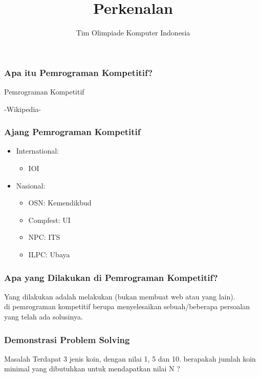 

\title{Perkenalan}
\author{Tim Olimpiade Komputer Indonesia}
\date{}



\begin{frame}
\titlepage
\end{frame}

\begin{frame}
\frametitle{Apa itu Pemrograman Kompetitif?}
\begin{block}{Pemrograman Kompetitif}

-Wikipedia-
\end{block}
\end{frame}

\begin{frame}
\frametitle{Ajang Pemrograman Kompetitif}
\begin{itemize}
  \item International:
    \begin{itemize}
    	\item IOI
    \end{itemize}
  \item Nasional:
    \begin{itemize}
    	\item OSN: Kemendikbud
    	\item Compfest: UI
    	\item NPC: ITS
    	\item ILPC: Ubaya
    \end{itemize} 
\end{itemize}

\end{frame}

\begin{frame}
\frametitle{Apa yang Dilakukan di Pemrograman Kompetitif?}
Yang dilakukan adalah melakukan  (bukan membuat web atau yang lain).
\\
 di pemrograman kompetitif berupa menyelesaikan sebuah/beberapa persoalan yang telah ada solusinya.
\end{frame}

\begin{frame}
\frametitle{Demonstrasi Problem Solving}
\begin{block}{Masalah}
Terdapat 3 jenis koin, dengan nilai 1, 5 dan 10.
berapakah jumlah koin minimal yang dibutuhkan untuk mendapatkan nilai N ?
\end{block}
\end{frame}

